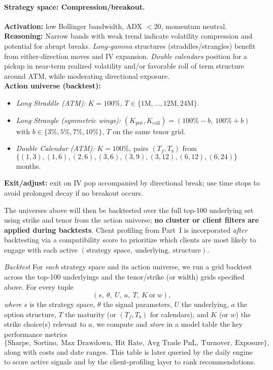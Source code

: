 \documentclass[12pt,a4paper]{report}
\begin{document}
\paragraph{Strategy space: Compression/breakout.}
\textbf{Activation:} low Bollinger bandwidth, ADX $<20$, momentum neutral. \\[2pt]
\textbf{Reasoning:} Narrow bands with weak trend indicate volatility compression and potential for abrupt breaks. \emph{Long-gamma} structures (straddles/strangles) benefit from either-direction moves and IV expansion. \emph{Double calendars} position for a pickup in near-term realized volatility and/or favorable roll of term structure around ATM, while moderating directional exposure. \\[2pt]
\textbf{Action universe (backtest):}
\begin{itemize}
    \item \emph{Long Straddle (ATM):} $K=100\%$,\; $T \in \{1\text{M},\dots,12\text{M},24\text{M}\}$.
    \item \emph{Long Strangle (symmetric wings):} $(K_{\text{put}},K_{\text{call}})=(100\%-b,\ 100\%+b)$ with 
    $b \in \{3\%,5\%,7\%,10\%\}$,\; $T$ on the same tenor grid.
    \item \emph{Double Calendar (ATM):} $K=100\%$,\; pairs $(T_f,T_b)$ from 
    $\{(1,3),(1,6),(2,6),(3,6),(3,9),(3,12),(6,12),(6,24)\}$ months.
\end{itemize}
\textbf{Exit/adjust:} exit on IV pop accompanied by directional break; use time stops to avoid prolonged decay if no breakout occurs.



The universes above will then be backtested over the full top-100 underlying set using strike and tenor from the action universe; \textbf{no cluster or client filters are applied during backtests}. Client profiling from Part~I is incorporated \emph{after} backtesting via a compatibility score to prioritize which clients are most likely to engage with each active $(\text{strategy space},\ \text{underlying},\ \text{structure})$.

\noindent\emph{Backtest } For \emph{each} strategy space and its action universe, we run a grid backtest across the top-100 underlyings and the tenor/strike (or width) grids specified above. For every tuple
\[
(s,\ \theta,\ U,\ a,\ T,\ K\ \text{or}\ w),
\]
\emph{where} $s$ is the strategy space, $\theta$ the signal parameters, $U$ the underlying, $a$ the option structure, $T$ the maturity (or $(T_f,T_b)$ for calendars), and $K$ (or $w$) the strike choice(s) relevant to $a$, we compute and \emph{store} in a model table the key performance metrics
\[
\{\text{Sharpe},\ \text{Sortino},\ \text{Max Drawdown},\ \text{Hit Rate},\ \text{Avg Trade PnL},\ \text{Turnover},\ \text{Exposure}\},
\]
along with costs and date ranges. This table is later queried by the daily engine to score active signals and by the client-profiling layer to rank recommendations.
\end{document}
